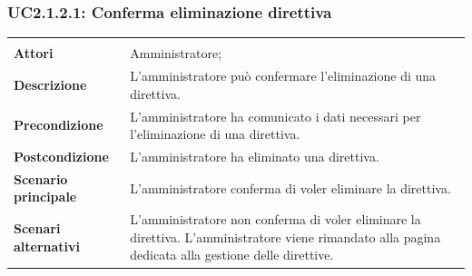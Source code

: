 \subsubsection{UC2.1.2.1: Conferma eliminazione direttiva}
\label{UC2.1.2.1}
\begin{longtable}{l|p{10cm}}
\hline
&\\
\textbf{Attori} & Amministratore;\\[7pt]
\textbf{Descrizione} & L'amministratore può confermare l'eliminazione di una direttiva.\\[7pt]
\textbf{Precondizione} & L'amministratore ha comunicato i dati necessari per l'eliminazione di una direttiva.\\[7pt]
\textbf{Postcondizione} & L'amministratore ha eliminato una direttiva.\\[7pt]
\textbf{Scenario principale} & L'amministratore conferma di voler eliminare la direttiva.\\[7pt]
\textbf{Scenari alternativi} & L'amministratore non conferma di voler eliminare la direttiva. L'amministratore viene rimandato alla pagina dedicata alla gestione delle direttive.\\[7pt]\hline
\end{longtable}

